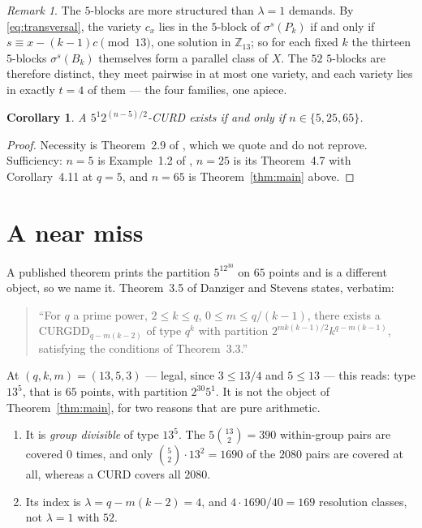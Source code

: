 \documentclass[11pt]{amsart}
\newtheorem{corollary}[theorem]{Corollary}
\theoremstyle{remark}
\newtheorem*{remark}{Remark}
\begin{document}
\begin{remark}
The $5$-blocks are more structured than $\lambda=1$ demands. By
\eqref{eq:transversal}, the variety $c_x$ lies in the $5$-block of
$\sigma^s(P_k)$ if and only if $s\equiv x-(k-1)c \pmod{13}$, one solution in
$\mathbb Z_{13}$; so for each fixed $k$ the thirteen $5$-blocks
$\sigma^s(B_k)$ themselves form a parallel class of $X$. The $52$ $5$-blocks
are therefore distinct, they meet pairwise in at most one variety, and each
variety lies in exactly $t=4$ of them --- the four families, one apiece.
\end{remark}

\begin{corollary}\label{cor:spectrum}
A $5^1 2^{(n-5)/2}$-CURD exists if and only if $n\in\{5,25,65\}$.
\end{corollary}

\begin{proof}
Necessity is Theorem~2.9 of \cite{CDRT}, which we quote and do not reprove.
Sufficiency: $n=5$ is Example~1.2 of \cite{CDRT}, $n=25$ is its Theorem~4.7 with
Corollary~4.11 at $q=5$, and $n=65$ is Theorem~\ref{thm:main} above.
\end{proof}

\section{A near miss}

A published theorem prints the partition $5^12^{30}$ on $65$ points and is a
different object, so we name it. Theorem~3.5 of Danziger and Stevens
\cite{DaSt04} states, verbatim:
\begin{quote}
\sloppy
``For $q$ a prime power, $2\le k\le q$, $0\le m\le q/(k-1)$, there exists a
CURGDD$_{q-m(k-2)}$ of type $q^k$ with partition
$2^{mk(k-1)/2}k^{q-m(k-1)}$, satisfying the conditions of Theorem~3.3.''
\end{quote}
At $(q,k,m)=(13,5,3)$ --- legal, since $3\le13/4$ and $5\le13$ --- this reads:
type $13^5$, that is $65$ points, with partition $2^{30}5^{1}$. It is not the
object of Theorem~\ref{thm:main}, for two reasons that are pure arithmetic.

\begin{enumerate}
\item It is \emph{group divisible} of type $13^5$. The
$5\binom{13}2=390$ within-group pairs are covered $0$ times, and only
$\binom52\cdot13^2=1690$ of the $2080$ pairs are covered at all, whereas a CURD
covers all $2080$.
\item Its index is $\lambda=q-m(k-2)=4$, and $4\cdot1690/40=169$ resolution
classes, not $\lambda=1$ with $52$.
\end{enumerate}
\end{document}
